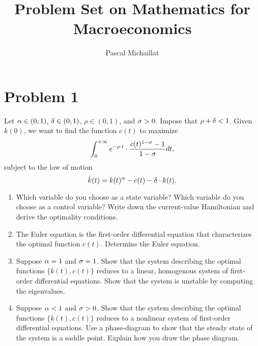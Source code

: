 \documentclass[letterpaper,12pt,leqno]{article}
\begin{document}
\title{Problem Set on Mathematics for Macroeconomics}
\author{Pascal Michaillat}
\date{}

\begin{titlepage}
\maketitle
\end{titlepage}

\section*{Problem 1}

Let $\alpha \in (0,1)$, $\delta  \in (0,1)$, $\rho \in (0,1)$, and $\sigma>0$. Impose that $\rho+\delta<1$. Given $k(0)$, we want to find the function $c(t) $ to maximize 
\begin{equation*}
\int_{0}^{+\infty }e^{-\rho\cdot  t}\cdot \frac{c(t)^{1-\sigma}-1}{1-\sigma} dt,
\end{equation*}
subject to the law of motion
\begin{equation*}
\dot{k}(t) =k(t)^{\alpha}-c(t)-\delta \cdot k(t).
\end{equation*}

\begin{enumerate}

\item  Which variable do you choose as a state variable? Which variable do you choose as a control variable? Write down the current-value Hamiltonian and derive the optimality conditions.

\item The Euler equation is the first-order differential equation that characterizes the optimal function $c(t)$. Determine the Euler equation.

\item  Suppose $\alpha =1$ and $\sigma =1$. Show that the system describing the optimal functions $\{k(t),c(t)\}$ reduces to a linear, homogenous system of first-order differential equations. Show that the system is unstable by computing the eigenvalues. 

\item  Suppose $\alpha <1$ and $\sigma >0$. Show that the system describing the optimal functions $\{k(t),c(t)\}$ reduces to a nonlinear system of first-order differential equations. Use a phase-diagram to show that the steady state of the system is a saddle point. Explain how you draw the phase diagram.

\end{enumerate}
\end{document}
